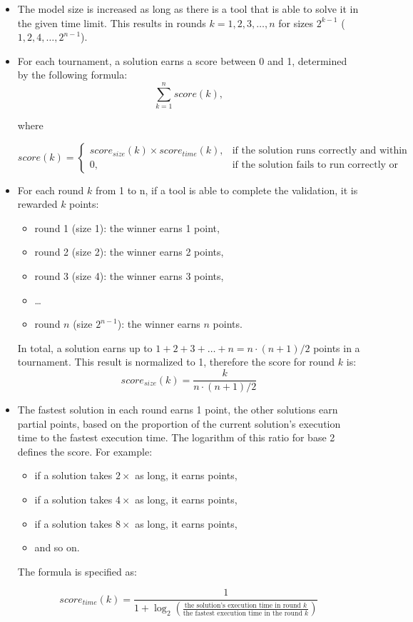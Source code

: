 \documentclass[submission,copyright,creativecommons]{eptcs}
\begin{document}
\begin{itemize}
  \item The model size is increased as long as there is a tool that is able to solve it in the given time limit. This results in rounds $k = 1, 2, 3, \ldots, n$ for sizes $2^{k-1}$ ($1, 2, 4, \ldots, 2^{n-1}$).  
  \item For each tournament, a solution earns a score between 0 and 1, determined by the following formula:
\[\sum^{\mathit{n}}_{k=1} \mathit{score}(k), \]

where
 
\[
\mathit{score}(k) =
\begin{cases}
    \mathit{score}_\mathit{size}(k) \times \mathit{score}_\mathit{time}(k), & \text{if the solution runs correctly and within the given time limit,}\\
    0,                                                                      & \text{if the solution fails to run correctly or exceeds the given time limit.}
\end{cases}
\]
  \item For each round $\mathit{k}$ from 1 to n, if a tool is able to complete the validation, it is rewarded $k$ points:
  	\begin{itemize}
  	  \item round 1 (size 1): the winner earns 1 point,
  	  \item round 2 (size 2): the winner earns 2 points,
  	  \item round 3 (size 4): the winner earns 3 points,
  	  \item \ldots
  	  \item round $n$ (size $2^{n-1}$): the winner earns $n$ points.
  	\end{itemize}
  In total, a solution earns up to $1 + 2 + 3 + \ldots + n = \mathit{n}\cdot(\mathit{n}+1)/2$ points in a tournament. This result is normalized to 1, therefore the score for round $k$ is:
  \[ \mathit{score}_\mathit{size}(k)= \frac{k}{\mathit{n}\cdot(\mathit{n}+1)/2} \]
  \item The fastest solution in each round earns 1 point, the other solutions earn partial points, based on the proportion of the current solution's execution time to the fastest execution time. The logarithm of this ratio for base 2 defines the score. For example:
  	\begin{itemize}
  	  \item if a solution takes $2 \times$ as long, it earns  points, 
  	  \item if a solution takes $4 \times$ as long, it earns  points,
  	  \item if a solution takes $8 \times$ as long, it earns  points,
  	  \item and so on.
  	\end{itemize}
  	
  	The formula is specified as:
  
    \[ \mathit{score}_\mathit{time}(k)=\frac{1}{1+\log_2\left(\frac{\text{the solution's execution time in round $k$}}{\text{the fastest execution time in the round $k$}}\right)} \]
\end{itemize}
\end{document}
